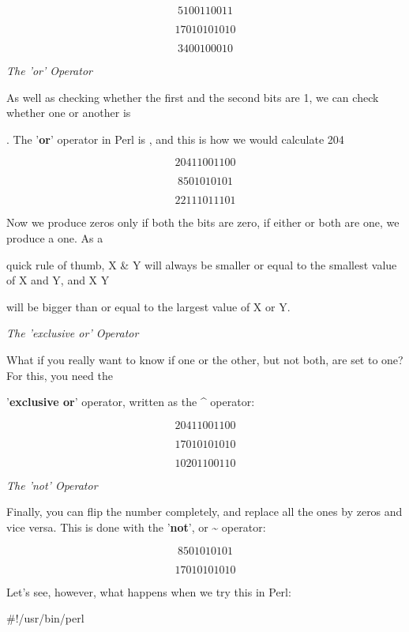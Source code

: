 \documentclass[a4paper,11pt]{book}
\begin{document}
\[51 00110011\] 

\[170   10101010\] 

\[34 00100010\] 


\noindent \textit{The 'or' Operator}

\noindent As well as checking whether the first and the second bits are 1, we can check whether one or another is

. The '\textbf{or}' operator in Perl is \textbar , and this is how we would calculate 204 

\noindent 

\[204   11001100\] 

\[85     01010101\] 

\[221   11011101\] 


\noindent Now we produce zeros only if both the bits are zero, if either or both are one, we produce a one. As a

\noindent quick rule of thumb, X \& Y will always be smaller or equal to the smallest value of X and Y, and X \textbar  Y

\noindent will be bigger than or equal to the largest value of X or Y.

\noindent 

\noindent \textit{The 'exclusive or' Operator}

\noindent What if you really want to know if one or the other, but not both, are set to one? For this, you need the

\noindent '\textbf{exclusive or}' operator, written as the \^{} operator:

\noindent 

\[204   11001100\] 

\[170   10101010\] 

\[102   01100110\] 


\noindent \textit{The 'not' Operator}

\noindent Finally, you can flip the number completely, and replace all the ones by zeros and vice versa. This is done with the '\textbf{not}', or \~{} operator:

\noindent 

\[85     01010101\] 

\[170   10101010\] 


\noindent Let's see, however, what happens when we try this in Perl:

\noindent 

\noindent 

\noindent \#!/usr/bin/perl
\end{document}

